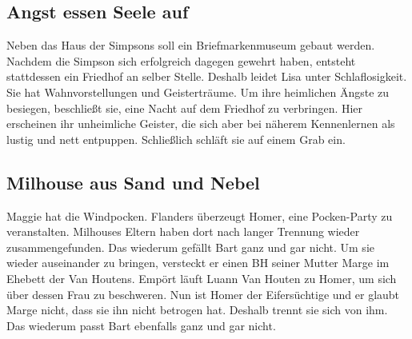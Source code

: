 
\subsection{Angst essen Seele auf}\label{GABF16}
Neben das Haus der Simpsons soll ein Briefmarkenmuseum gebaut werden. Nachdem die Simpson sich erfolgreich dagegen gewehrt haben, entsteht stattdessen ein Friedhof an selber Stelle. Deshalb leidet Lisa unter Schlaflosigkeit. Sie hat Wahnvorstellungen und Geisterträume. Um ihre heimlichen Ängste zu besiegen, beschließt sie, eine Nacht auf dem Friedhof zu verbringen. Hier erscheinen ihr unheimliche Geister, die sich aber bei näherem Kennenlernen als lustig und nett entpuppen. Schließlich schläft sie auf einem Grab ein.


\subsection{Milhouse aus Sand und Nebel}\label{GABF19}
Maggie hat die Windpocken. Flanders überzeugt Homer, eine Pocken-Party zu veranstalten. Milhouses Eltern haben dort nach langer Trennung wieder zusammengefunden. Das wiederum gefällt Bart ganz und gar nicht. Um sie wieder auseinander zu bringen, versteckt er einen BH seiner Mutter Marge im Ehebett der Van Houtens. Empört läuft Luann Van Houten zu Homer, um sich über dessen Frau zu beschweren. Nun ist Homer der Eifersüchtige und er glaubt Marge nicht, dass sie ihn nicht betrogen hat. Deshalb trennt sie sich von ihm. Das wiederum passt Bart ebenfalls ganz und gar nicht.

